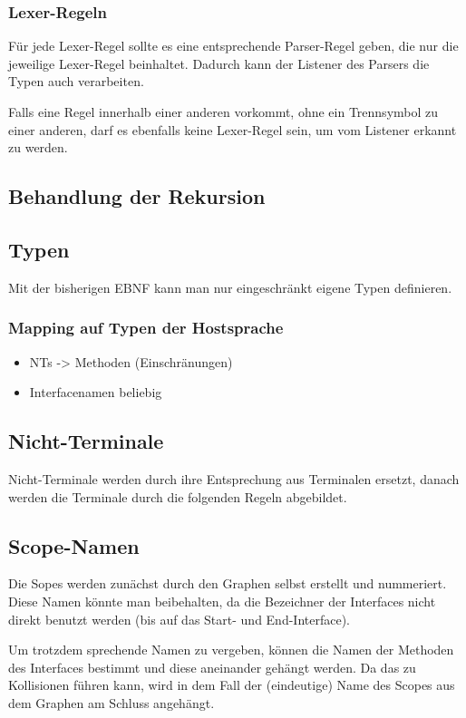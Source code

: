 \documentclass[../InterneDSLs.tex]{subfiles}
\begin{document}
\subsubsection{Lexer-Regeln}
Für jede Lexer-Regel sollte es eine entsprechende Parser-Regel geben, die nur die jeweilige Lexer-Regel beinhaltet. Dadurch kann der Listener des Parsers die Typen auch verarbeiten.

Falls eine Regel innerhalb einer anderen vorkommt, ohne ein Trennsymbol zu einer anderen, darf es ebenfalls keine Lexer-Regel sein, um vom Listener erkannt zu werden.


\subsection{Behandlung der Rekursion}

\subsection{Typen}
Mit der bisherigen EBNF kann man nur eingeschränkt eigene Typen definieren.

\subsubsection{Mapping auf Typen der Hostsprache}
\begin{itemize}
	\item NTs -> Methoden (Einschränungen)
	\item Interfacenamen beliebig
\end{itemize}

\subsection{Nicht-Terminale}
Nicht-Terminale werden durch ihre Entsprechung aus Terminalen ersetzt, danach werden die Terminale durch die folgenden Regeln abgebildet.

\subsection{Scope-Namen}
Die Sopes werden zunächst durch den Graphen selbst erstellt und nummeriert. Diese Namen könnte man beibehalten, da die Bezeichner der Interfaces nicht direkt benutzt werden (bis auf das Start- und End-Interface).

Um trotzdem sprechende Namen zu vergeben, können die Namen der Methoden des Interfaces bestimmt und diese aneinander gehängt werden. Da das zu Kollisionen führen kann, wird in dem Fall der (eindeutige) Name des Scopes aus dem Graphen am Schluss angehängt.
\end{document}
